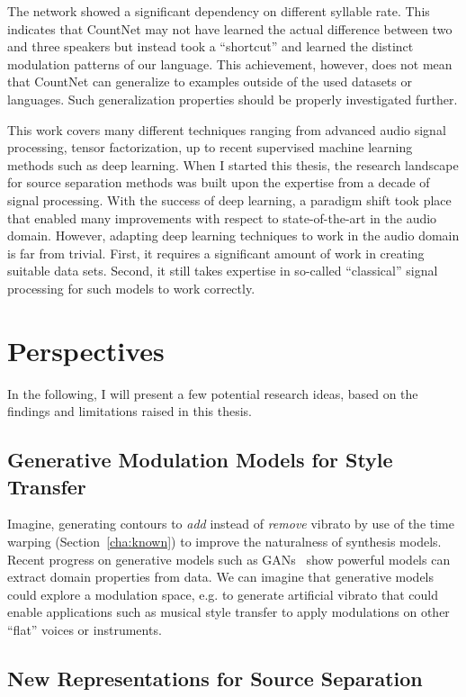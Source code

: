 The network showed a significant dependency on different syllable rate. This indicates that CountNet may not have learned the actual difference between two and three speakers but instead took a ``shortcut'' and learned the distinct modulation patterns of our language.
This achievement, however, does not mean that CountNet can generalize to examples outside of the used datasets or languages. Such generalization properties should be properly investigated further.
\par
This work covers many different techniques ranging from advanced audio signal processing, tensor factorization, up to recent supervised machine learning methods such as deep learning.
When I started this thesis, the research landscape for source separation methods was built upon the expertise from a decade of signal processing.
With the success of deep learning, a paradigm shift took place that enabled many improvements with respect to state-of-the-art in the audio domain. However, adapting deep learning techniques to work in the audio domain is far from trivial. First, it requires a significant amount of work in creating suitable data sets. Second, it still takes expertise in so-called ``classical'' signal processing for such models to work correctly.

\section{Perspectives}

In the following, I will present a few potential research ideas, based on the findings and limitations raised in this thesis.

\subsection*{Generative Modulation Models for Style Transfer}
Imagine, generating contours to \emph{add} instead of \emph{remove} vibrato by use of the time warping (Section~\ref{cha:known}) to improve the naturalness of synthesis models.
Recent progress on generative models such as GANs~\cite{goodfellow14} show powerful models can extract domain properties from data.
We can imagine that generative models could explore a modulation space, e.g. to generate artificial vibrato that could enable applications such as musical style transfer to apply modulations on other ``flat'' voices or instruments.

\subsection*{New Representations for Source Separation}

